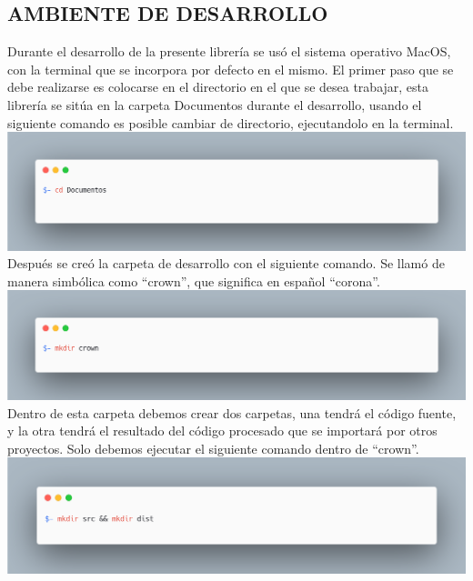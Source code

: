 \subsection{AMBIENTE DE DESARROLLO}
Durante el desarrollo de la presente librería se usó el sistema operativo MacOS, con la terminal que se incorpora por defecto en el mismo.
El primer paso que se debe realizarse es colocarse en el directorio en el que se desea trabajar, esta librería se sitúa en la carpeta Documentos durante el desarrollo, usando el siguiente comando es posible cambiar de directorio, ejecutandolo en la terminal.
 \newline
 \newline
\includegraphics[width=1\textwidth]{./Imagenes/image15.png}
 \newline
 \newline
 Después se creó la carpeta de desarrollo con el siguiente comando. Se llamó de manera simbólica como “crown”, que significa en español “corona”.
 \newline
\newline
\includegraphics[width=1\textwidth]{./Imagenes/image7.png}
\newline
\newline
Dentro de esta carpeta debemos crear dos carpetas, una tendrá el código fuente, y la otra tendrá el resultado del código procesado que se importará por otros proyectos. Solo debemos ejecutar el siguiente comando dentro de “crown”.
 \newline
\newline
\includegraphics[width=1\textwidth]{./Imagenes/image37.png}
\newline
\newline

